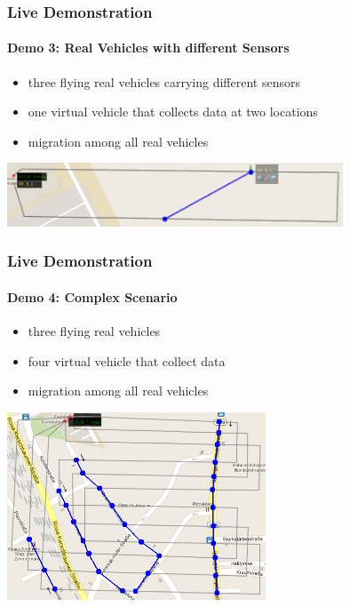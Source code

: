\documentclass{beamer}
\begin{document}

\begin{frame}\frametitle{Live Demonstration}\framesubtitle{Demo 3: Real Vehicles with different Sensors}
	\begin{itemize}
		\item three flying real vehicles carrying different sensors
		\item one virtual vehicle that collects data at two locations
		\item migration among all real vehicles
	\end{itemize}
	\vspace{0.5cm}
	\begin{center}
		{\includegraphics[width=10cm]{demo3.png}}
	\end{center}
\end{frame}



\begin{frame}\frametitle{Live Demonstration}\framesubtitle{Demo 4: Complex Scenario}
	\begin{itemize}
		\item three flying real vehicles
		\item four virtual vehicle that collect data
		\item migration among all real vehicles
	\end{itemize}
	\begin{center}
		{\includegraphics[width=7.7cm]{demo4.png}}
	\end{center}
\end{frame}
\end{document}
